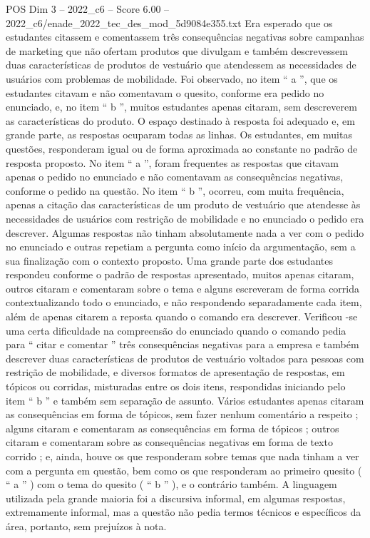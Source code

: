 \begin{textsample}{POS Dim 3 – 2022\_c6 – Score 6.00 – 2022\_c6/enade\_2022\_tec\_des\_mod\_5d9084e355.txt}
Era esperado que os estudantes citassem e comentassem três consequências negativas sobre campanhas de marketing que não ofertam produtos que divulgam e também descrevessem duas características de produtos de vestuário que atendessem as necessidades de usuários com problemas de mobilidade.
Foi observado, no item “ a ”, que os estudantes citavam e não comentavam o quesito, conforme era pedido no enunciado, e, no item “ b ”, muitos estudantes apenas citaram, sem descreverem as características do produto.
O espaço destinado à resposta foi adequado e, em grande parte, as respostas ocuparam todas as linhas.
Os estudantes, em muitas questões, responderam igual ou de forma aproximada ao constante no padrão de resposta proposto.
No item “ a ”, foram frequentes as respostas que citavam apenas o pedido no enunciado e não comentavam as consequências negativas, conforme o pedido na questão.
No item “ b ”, ocorreu, com muita frequência, apenas a citação das características de um produto de vestuário que atendesse às necessidades de usuários com restrição de mobilidade e no enunciado o pedido era descrever.
Algumas respostas não tinham absolutamente nada a ver com o pedido no enunciado e outras repetiam a pergunta como início da argumentação, sem a sua finalização com o contexto proposto.
Uma grande parte dos estudantes respondeu conforme o padrão de respostas apresentado, muitos apenas citaram, outros citaram e comentaram sobre o tema e alguns escreveram de forma corrida contextualizando todo o enunciado, e não respondendo separadamente cada item, além de apenas citarem a reposta quando o comando era descrever.
Verificou -se uma certa dificuldade na compreensão do enunciado quando o comando pedia para “ citar e comentar ” três consequências negativas para a empresa e também descrever duas características de produtos de vestuário voltados para pessoas com restrição de mobilidade, e diversos formatos de apresentação de respostas, em tópicos ou corridas, misturadas entre os dois itens, respondidas iniciando pelo item “ b ” e também sem separação de assunto.
Vários estudantes apenas citaram as consequências em forma de tópicos, sem fazer nenhum comentário a respeito ; alguns citaram e comentaram as consequências em forma de tópicos ; outros citaram e comentaram sobre as consequências negativas em forma de texto corrido ; e, ainda, houve os que responderam sobre temas que nada tinham a ver com a pergunta em questão, bem como os que responderam ao primeiro quesito ( “ a ” ) com o tema do quesito ( “ b ” ), e o contrário também.
A linguagem utilizada pela grande maioria foi a discursiva informal, em algumas respostas, extremamente informal, mas a questão não pedia termos técnicos e específicos da área, portanto, sem prejuízos à nota.

\end{textsample}
